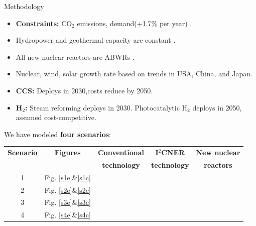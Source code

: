 \documentclass[final]{beamer}
\newlength{\onecolwid}
\newlength{\twocolwid}
\newlength{\threecolwid}
\newcommand{\greencheck}{{\color{green}\checkmark}}
\newcommand{\xmark}{{\color{red}\ding{55}}}
\begin{document}
\begin{frame}[t]
\begin{columns}[t,totalwidth=\threecolwid]
\begin{column}{\twocolwid}
\begin{columns}[t,totalwidth=\twocolwid]
\begin{column}{\onecolwid}
\begin{block}{Methodology}
\begin{itemize}
         \item\textbf{Constraints:} CO$_2$ emissions, demand(+1.7\% per year) \cite{noauthor_electricity_2017}.
         
         \item Hydropower and geothermal capacity are constant \cite{noauthor_energy_2018}.
                  
         \item All new nuclear reactors are ABWRs \cite{rothwell_real_2006}.
         
         \item Nuclear, wind, solar growth rate based on trends in USA, China, and Japan.\cite{noauthor_electricity_2017,noauthor_energy_2018,eia_international_nodate,eia_monthly_2018,iea-pvps_snapshot_2018}
         
         \item \textbf{CCS:} Deploys in 2030,costs reduce by 2050. \cite{kato_energy_2016}
         
         \item \textbf{H$_2$:} Steam reforming deploys in 2030. Photocatalytic H$_2$ deploys in 2050, assumed cost-competitive. \cite{kato_energy_2016} \cite{acar_comparative_2014} \\         
 \end{itemize}   
 
We have modeled \textbf{four scenarios}:\hfill \break

\begin{tabular}{| c | c | c | c | c |}
\hline
\textbf{Scenario}& \textbf{Figures}&\textbf{Conventional}&\textbf{I$^2$CNER}&\textbf{New nuclear}\\
                 &             &\textbf{technology}&\textbf{technology}&\textbf{reactors}\\
                  \hline
1               & Fig. \ref{s1e}\&\ref{s1c}&      \greencheck           &         \xmark       &      \greencheck     \\ 
2               & Fig. \ref{s2e}\&\ref{s2c}&      \greencheck           &         \xmark       &         \xmark       \\ 
3               & Fig. \ref{s3e}\&\ref{s3c}&      \greencheck           &      \greencheck     &      \greencheck     \\ 
4               & Fig. \ref{s4e}\&\ref{s4c}&      \greencheck           &      \greencheck     &         \xmark       \\
\hline
\end{tabular}
\end{block}


\end{column}
\end{columns}
\end{column}
\end{columns}
\end{frame}
\end{document}
